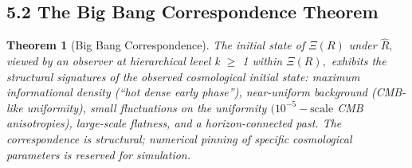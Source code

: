 \documentclass[11pt,oneside]{report}
\newtheorem{theorem}{Theorem}[section]
\theoremstyle{definition}
\theoremstyle{remark}
\begin{document}
\subsection*{5.2 The Big Bang Correspondence Theorem}

\begin{theorem}[Big Bang Correspondence]
The initial state of \ensuremath{\Xi (R)}
under \ensuremath{\hat{R},} viewed by an observer at hierarchical level k \ensuremath{\geq} 1 within \ensuremath{\Xi (R),}
exhibits the structural signatures of the observed cosmological initial
state: maximum informational density (``hot dense early phase''),
near-uniform background (CMB-like uniformity), small fluctuations on the
uniformity \ensuremath{(10^{-5}-\text{scale}} CMB anisotropies), large-scale flatness, and a
horizon-connected past. The correspondence is structural; numerical
pinning of specific cosmological parameters is reserved for simulation.
\end{theorem}
\end{document}
